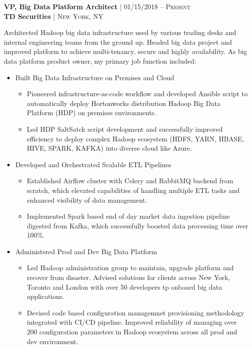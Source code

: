 {\raggedright\normalsize
\textbf{VP, Big Data Platform Architect} {\hfill\footnotesize\textsc{| 01/15/2018 -- Present}}\\ 
\textbf{TD Securities} {\hfill\footnotesize\textsc{| New York, NY}}}
\setlength\vspace{1pt}

Architected Hadoop big data infrastructure used by various trading desks and internal engineering teams from the ground up.
Headed big data project and improved platform to achieve multi-tenancy, secure and highly availability. 
As big data platform product owner, my primary job function included:  

\begin{itemize}[leftmargin=*, topsep=2pt, partopsep=2.5pt]
\setlength\itemsep{-0.2em}

\item Built Big Data Infrastructure on Premises and Cloud

\begin{itemize}[leftmargin=*, topsep=-5pt, partopsep=2.5pt]
\setlength\itemsep{-0.2em}
\item Pioneered infrastructure-as-code workflow and developed Ansible script to automatically deploy Hortonworks distribution Hadoop Big Data Platform (HDP) on premises environments.  
\item Led HDP SaltSatck script development and successfully improved efficiency to deploy complex Hadoop ecosystem (HDFS, YARN, HBASE, HIVE, SPARK, KAFKA) into diverse cloud like Azure.
\end{itemize}

\item Developed and Orchestrated Scalable ETL Pipelines

\begin{itemize}[leftmargin=*, topsep=-5pt, partopsep=2.5pt]
\setlength\itemsep{-0.2em}
\item Established Airflow cluster with Celery and RabbitMQ backend from scratch, which elevated capabilities of handling multiple ETL tasks and enhanced visibility of data management.
\item Implemented Spark based end of day market data ingestion pipeline digested from Kafka, which successfully boosted data processing time over 100\%.
\end{itemize}

\item Administered Prod and Dev Big Data Platform

\begin{itemize}[leftmargin=*, topsep=-5pt, partopsep=2.5pt]
\setlength\itemsep{-0.2em}
\item Led Hadoop administration group to maintain, upgrade platform and recover from disaster. Advised solutions for clients across New York, Toronto and London with over 50 developers tp onboard big data applications.
\item Devised code based configuration managemnet provisioning methodology integrated with CI/CD pipeline. Improved reliability of managing over 200 configuration parameters in Hadoop ecosystem across all prod and dev environment.
\end{itemize}

\end{itemize}

